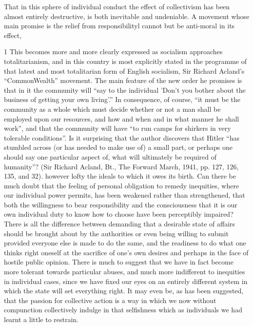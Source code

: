 \documentclass[11pt,openany]{book}
\begin{document}
That in this sphere of individual conduct the effect of collectivism has been almost entirely destructive, is both inevitable and undeniable. A movement whose main promise is the relief from responsibilityl cannot but be anti-moral in its effect,

1 This becomes more and more clearly expressed as socialism approaches totalitarianism, and in this country is most explicitly stated in the programme of that latest and most totalitarian form of English socialism, Sir Richard Acland's ``CommonWealth'' movement. The main feature of the new order he promises is that in it the community will ``say to the individual 'Don't you bother about the business of getting your own living'.'' In consequence, of course, ``it must be the community as a whole which must decide whether or not a man shall be employed upon our resources, and how and when and in what manner he shall work'', and that the community will have ``to run camps for shirkers in very tolerable conditions''. Is it surprising that the author discovers that Hitler ``has stumbled across (or has needed to make use of) a small part, or perhaps one should say one particular aspect of, what will ultimately be required of humanity''? (Sir Richard Acland, Bt., The Forward March, 1941, pp. 127, 126, 135, and 32). however lofty the ideals to which it owes its birth. Can there be much doubt that the feeling of personal obligation to remedy inequities, where our individual power permits, has been weakened rather than strengthened, that both the willingness to bear responsibility and the consciousness that it is our own individual duty to know how to choose have been perceptibly impaired? There is all the difference between demanding that a desirable state of affairs should be brought about by the authorities or even being willing to submit provided everyone else is made to do the same, and the readiness to do what one thinks right oneself at the sacrifice of one's own desires and perhaps in the face of hostile public opinion. There is much to suggest that we have in fact become more tolerant towards particular abuses, and much more indifferent to inequities in individual cases, since we have fixed our eyes on an entirely different system in which the state will set everything right. It may even be, as has been suggested, that the passion for collective action is a way in which we now without compunction collectively indulge in that selfishness which as individuals we had learnt a little to restrain.
\end{document}

